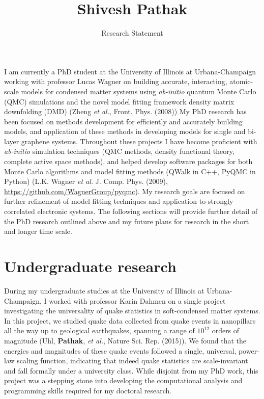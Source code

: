 \documentclass{article}
\title{Shivesh Pathak}
\date{Research Statement}
\begin{document}
\maketitle 

I am currently a PhD student at the University of Illinois at Urbana-Champaign working with professor Lucas Wagner on building accurate, interacting, atomic-scale models for condensed matter systems using \textit{ab-initio} quantum Monte Carlo (QMC) simulations and the novel model fitting framework density matrix downfolding (DMD) (Zheng \textit{et al.}, Front. Phys.  (2008))
My PhD research has been focused on methods development for efficiently and accurately building models, and application of these methods in developing models for single and bi-layer graphene systems.
Throughout these projects I have become proficient with \textit{ab-initio} simulation techniques (QMC methods, density functional theory, complete active space methods), and helped develop software packages for both Monte Carlo algorithms and model fitting methods (QWalk in C++, PyQMC in Python) (L.K. Wagner \textit{et al.} J.  Comp.  Phys. (2009), \url{https://github.com/WagnerGroup/pyqmc}).
My research goals are focused on further refinement  of model fitting techniques and application to strongly correlated electronic systems.
The following sections will provide further detail of the PhD research outlined above and my future plans for research in the short and longer time scale.

\section{Undergraduate research}
During my undergraduate studies at the University of Illinois at Urbana-Champaign, I worked with professor Karin Dahmen on a single project investigating the universality of quake statistics in soft-condensed matter systems.
In this project,  we studied quake data collected from quake events in nanopillars all the way up to geological earthquakes, spanning a range of $10^{12}$ orders of magnitude (Uhl, \textbf{Pathak}, \textit{et al.}, Nature Sci. Rep. (2015)).
We found that the energies and magnitudes of these quake events followed a single, universal, power-law scaling function, indicating that indeed quake statistics are scale-invariant and fall formally under a university class.
While disjoint from my PhD work, this project was a stepping stone into developing the computational analysis and programming skills required for my doctoral research.
\end{document}
